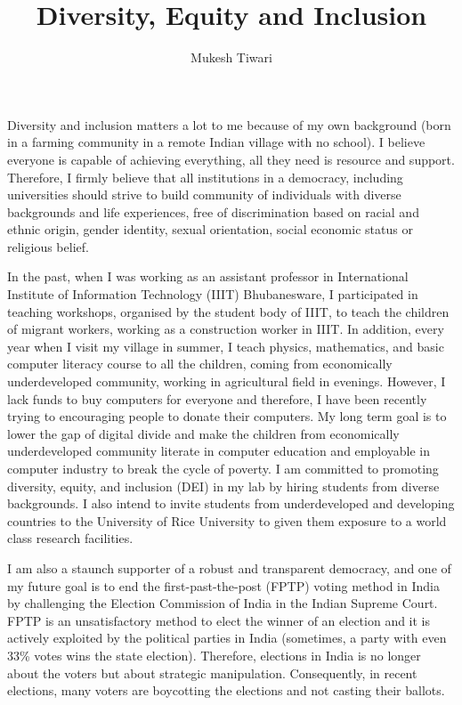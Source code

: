 \documentclass[a4paper]{article}
\title{Diversity, Equity and Inclusion}
\author{Mukesh Tiwari}
\date{}
\begin{document}
\fontsize{12}{15}
\selectfont
\maketitle

Diversity and inclusion matters a lot to me because of my own background (born in 
a farming community in a remote Indian village with no school). I believe everyone is capable of 
achieving everything, all they need is resource and support. Therefore,  I firmly believe that 
all institutions in a democracy, including universities should strive to build
community of individuals with diverse backgrounds and life experiences, 
free of discrimination based on racial and ethnic origin, gender identity, 
sexual orientation, social economic status or religious belief. 

\vspace{0.5cm}
In the past, when I was working as an assistant professor in International Institute of 
Information Technology (IIIT) Bhubanesware, I participated in teaching 
workshops, organised by the student body of IIIT, to teach the 
children of migrant workers, working as a construction worker in IIIT.
In addition, every year when I visit my village 
in summer, I teach physics, mathematics, and basic computer literacy course to 
all the children, coming from 
economically underdeveloped community, working in 
agricultural field in evenings. However, I lack funds to buy computers for everyone 
and therefore, I have been recently trying to encouraging people to donate 
their computers. My long term goal is to lower the gap of digital divide and make the 
children from economically underdeveloped community literate in computer education 
and employable in computer industry to break the cycle of poverty. 
I am committed to promoting diversity, equity, and inclusion (DEI) in my lab by 
hiring students from diverse backgrounds. I also intend to invite 
students from underdeveloped and developing countries to the University of 
Rice University to given them exposure to a world class research facilities. 



\vspace{0.5cm}
I am also a staunch supporter of a robust and transparent 
democracy, and one of my future goal is to end the 
first-past-the-post (FPTP) voting method in India by challenging the Election 
Commission of India in the Indian Supreme Court. FPTP is an unsatisfactory method 
to elect the winner of an election and it is actively exploited by 
the political parties in India (sometimes, a party with even 33\% votes 
wins the state election). Therefore, elections in India is no longer 
about the voters but about strategic manipulation. Consequently, 
in recent elections, many voters are boycotting the elections and 
not casting their ballots. 
\end{document}
